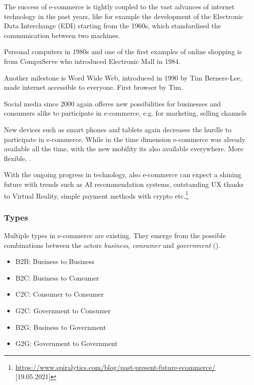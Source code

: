 The success of e-commerce is tightly coupled to the vast advances of internet technology in the past years, like for example the development of the Electronic Data Interchange (EDI) starting from the 1960s, which standardised the communication between two machines.

Personal computers in 1980s and one of the first examples of online shopping is from CompuServe who introduced Electronic Mall in 1984.

Another milestone is Word Wide Web, introduced in 1990 by Tim Berners-Lee, made internet accessible to everyone.
First browser by Tim.

Social media since 2000 again offeres new possibilities for businesses and consumers alike to participate in e-commerce, e.g. for marketing, selling channels

New devices such as smart phones and tablets again decreases the hurdle to participate in e-commerce.
While in the time dimension e-commerce was already available all the time, with the new mobility its also available everywhere.
More flexible.
\cite{2019Hermogeno}.

With the ongoing progress in technology, also e-commerce can expect a shining future with trends such as AI recommendation systems, outstanding UX thanks to Virtual Reality, simple payment methods with crypto etc.\footnote{\url{https://www.spiralytics.com/blog/past-present-future-ecommerce/} [19.05.2021]}


\subsubsection{Types}

Multiple types in e-commerce are existing. They emerge from the possible combinations between the actors \textit{business}, \textit{consumer} and \textit{government} (\cite{2017DosSantos}).

\begin{itemize}
\item B2B: Business to Business
\item B2C: Business to Consumer
\item C2C: Consumer to Consumer
\item G2C: Government to Consumer
\item B2G: Business to Government
\item G2G: Government to Government
\end{itemize}

